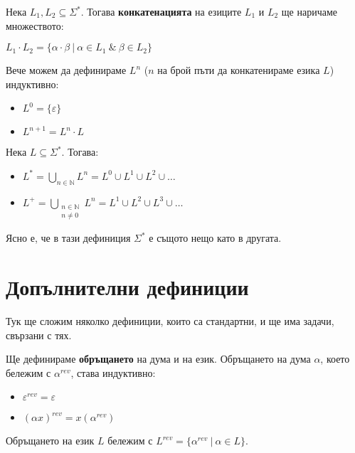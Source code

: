 \begin{definition}
    Нека $L_1, L_2 \subseteq \Sigma^*$.
    Тогава \textbf{конкатенацията} на езиците $L_1$ и $L_2$ ще наричаме множеството:
    \begin{center}
        $L_1 \cdot L_2 = \{ \alpha \cdot \beta \: | \: \alpha \in L_1 \: \& \: \beta \in L_2 \}$ \\
    \end{center}
\end{definition}

Вече можем да дефинираме $L^n$ ($n$ на брой пъти да конкатенираме езика $L$) индуктивно:
\begin{itemize}
    \item $L^0 = \{ \varepsilon \}$
    \item $L^{n + 1} = L^n \cdot L$
\end{itemize}

\begin{definition}
    Нека $L \subseteq \Sigma^*$. Тогава:
    \begin{itemize}
        \item $L^* = \bigcup\limits_{n \in \mathbb{N}} L^n = L^0 \cup L^1 \cup L^2 \cup \dots $
        \item $L^+ = \bigcup\limits_{\substack{n \in \mathbb{N} \\ n \neq 0}} L^n = L^1 \cup L^2 \cup L^3 \cup \dots $
    \end{itemize}
\end{definition}

Ясно е, че в тази дефиниция $\Sigma^*$ е същото нещо като в другата.

\pagebreak

\section{Допълнителни дефиниции}

Тук ще сложим няколко дефиниции, които са стандартни, и ще има задачи, свързани с тях.

\begin{definition}
    Ще дефинираме \textbf{обръщането} на дума и на език.
    Обръщането на дума $\alpha$, което бележим с $\alpha^{rev}$, става индуктивно:
    \begin{itemize}
        \item $\varepsilon^{rev} = \varepsilon$
        \item $(\alpha x)^{rev} = x(\alpha^{rev})$
    \end{itemize}
    Обръщането на език $L$ бележим с $L^{rev} = \{\alpha^{rev} \: | \: \alpha \in L \}$.
\end{definition}

